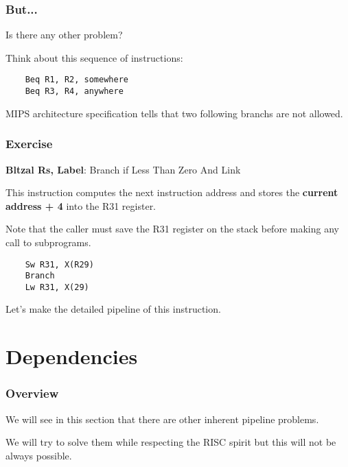 \begin{frame}[containsverbatim]
  \frametitle{But...}

  Is there any other problem?

  \nl

  Think about this sequence of instructions:

  \begin{verbatim}
    Beq R1, R2, somewhere
    Beq R3, R4, anywhere
  \end{verbatim}

  \nl

  MIPS architecture specification tells that two following branchs are
  not allowed.
\end{frame}


\begin{frame}[containsverbatim]
  \frametitle{Exercise}

  \textbf{Bltzal Rs, Label}: Branch if Less Than Zero And Link

  \nl

  This instruction computes the next instruction address and stores
  the \textbf{current address + 4} into the R31 register.

  \nl

  Note that the caller must save the R31 register on the stack before
  making any call to subprograms.

  \begin{verbatim}
    Sw R31, X(R29)
    Branch
    Lw R31, X(29)
  \end{verbatim}

  \nl

  Let's make the detailed pipeline of this instruction.
\end{frame}

%
%

\section{Dependencies}


\begin{frame}
  \frametitle{Overview}

  We will see in this section that there are other inherent pipeline
  problems.

  \nl

  We will try to solve them while respecting the RISC spirit but
  this will not be always possible.
\end{frame}

